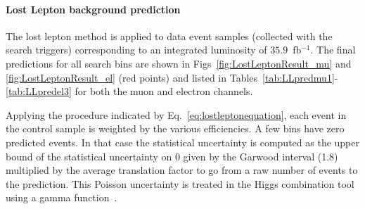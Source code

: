 \paragraph{Lost Lepton background prediction}

The lost lepton method is applied to data event samples (collected with the search triggers) corresponding to an integrated luminosity of $35.9$~fb$^{-1}$. The final predictions for all search bins are shown in Figs~\ref{fig:LostLeptonResult_mu} and \ref{fig:LostLeptonResult_el} (red points) and listed in Tables~\ref{tab:LLpredmu1}-\ref{tab:LLpredel3} for both the muon and electron channels.

Applying the procedure indicated by Eq.~\ref{eq:lostleptonequation}, each event in the control sample is weighted by the various efficiencies. 
A few bins have zero predicted events. In that case the statistical uncertainty is computed as the upper bound of the statistical uncertainty on 0 given by the Garwood interval (1.8) multiplied by the average translation factor to go from a raw number of events to the prediction. This Poisson uncertainty is treated in the Higgs combination tool using a gamma function~\cite{HiggsCombine,cms-note-2011-005}.

